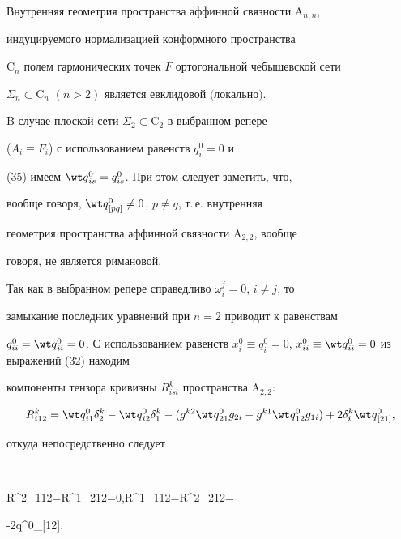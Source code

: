  


\begin{thm} 


Внутренняя геометрия пространства аффинной связности $\mathrm A_{n,n}$, 


индуцируемого нормализацией конформного пространства 


$\mathrm C_n$ полем гармонических точек $F$ ортогональной чебышевской сети 


$\Sigma_n\subset\mathrm C_n$ $(n>2)$ является евклидовой $($локально$)$. 


\end{thm} 


 


B случае плоской сети $\Sigma_2\subset\mathrm C_2$ в выбранном репере 


($A_i\equiv F_i$) с использованием равенств $q^0_i=0$ и 


(35) имеем $\wt q{}^0_{is}=q^0_{is}$. При этом следует заметить, что, 


вообще говоря, $\wt q{}^0_{[pq]}\ne0$, $p\ne q$, т.\,е. внутренняя 


геометрия пространства аффинной связности $\mathrm A_{2,2}$, вообще 


говоря, не является римановой. 


 


Так как в выбранном репере справедливо $\omega^j_i=0$, $i\ne j$, то 


замыкание последних уравнений при $n=2$ приводит к равенствам 


$q^0_{ii}=\wt q{}^0_{ii}=0$. С использованием равенств $x^0_i\equiv 


q^0_i=0$, $x^0_{ii}\equiv\wt q{}^0_{ii}=0$ из выражений (32) находим 


компоненты тензора кривизны $R^k_{ist}$ пространства $\mathrm A_{2,2}$: 


$$ 


R^k_{i12}=\wt q{}^0_{i1}\delta^k_2-\wt q{}^0_{i2}\delta^k_1- 


(g^{k2}\wt q{}^0_{21}g_{2i}-g^{k1}\wt q{}^0_{12}g_{1i})+ 


2\delta^k_i\wt q{}^0_{[21]}, 


$$ 


откуда непосредственно следует 


$$ 


R^2_{112}=R^1_{212}=0,\quad R^1_{112}=R^2_{212}= 


-2\wt q{}^0_{[12]}. 


